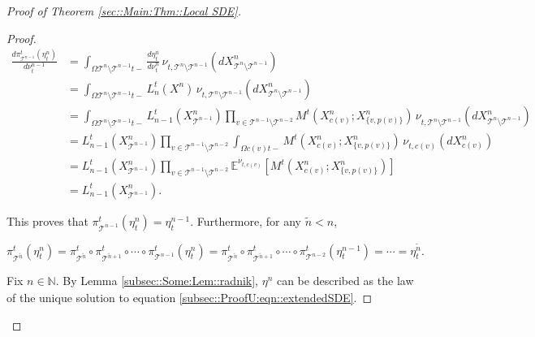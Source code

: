 \documentclass[12pt]{article}
\newcommand{\mb}{\mathbb}
\newcommand{\mc}{\mathcal}
\newcommand{\ind}{\hspace{24pt}}
\newcommand{\exmu}[2]{\mb{E}^{#1}\left[#2\right]}	%
\renewcommand{\v}{v}							%
\renewcommand{\t}{t}							%
\newcommand{\pup}[1]{^{#1}}							%
\newcommand{\tree}{\mc{T}}							%
\newcommand{\numb}{n}								%
\newcommand{\piV}[2]{\pi_{#1}^{#2}}					%
\newcommand{\rxvtsn}[3]{X_{#1}^{#3}{#2}}			%
\newcommand{\mm}[3]{\nu_{#2#1}^{#3}}						%
\newcommand{\mmm}[3]{\eta_{#2#1}^{#3}}						%
\newcommand{\alt}{\widetilde}						%
\newcommand{\dense}[2]{L_{#1}^{#2}}				%
\newcommand{\cdense}[2]{M_{#1}^{#2}}			%
\renewcommand{\c}[1]{c(#1)}						%
\newcommand{\p}[1]{p(#1)}						%
\begin{document}
\begin{proof}[Proof of Theorem \ref{sec::Main:Thm::Local SDE}]
\begin{proof}
\begin{align*}
\frac{d\piV{\tree\pup{\numb-1}}{\t}(\mmm{}{\t}{\numb})}{d\mm{}{\t}{\numb-1}} &= \int_{\Omega{\tree\pup{\numb}\setminus\tree\pup{\numb-1}}{\t-}} \frac{d\mmm{}{\t}{\numb}}{d\mm{}{\t}{\numb}}\,\mm{\tree\pup{\numb}\setminus\tree\pup{\numb-1}}{\t,}{}(d\rxvtsn{\tree\pup{\numb}\setminus\tree\pup{\numb-1}}{}{\numb})\\
&=\int_{\Omega{\tree\pup{\numb}\setminus\tree\pup{\numb-1}}{\t-}} \dense{\numb}{\t}(\rxvtsn{}{}{\numb})\,\mm{\tree\pup{\numb}\setminus\tree\pup{\numb-1}}{\t,}{}(d\rxvtsn{\tree\pup{\numb}\setminus\tree\pup{\numb-1}}{}{\numb})\\
&= \int_{\Omega{\tree\pup{\numb}\setminus\tree\pup{\numb-1}}{\t-}} \dense{\numb-1}{\t}(\rxvtsn{\tree\pup{\numb-1}}{}{\numb})\prod_{\v\in \tree\pup{\numb-1}\setminus\tree\pup{\numb-2}} \cdense{}{\t}(\rxvtsn{\c{\v}}{}{\numb};\rxvtsn{\{v,\p{\v}\}}{}{\numb})\,\mm{\tree\pup{\numb}\setminus\tree\pup{\numb-1}}{\t,}{}(d\rxvtsn{\tree\pup{\numb}\setminus\tree\pup{\numb-1}}{}{\numb})\\
&= \dense{\numb-1}{\t}(\rxvtsn{\tree\pup{\numb-1}}{}{\numb})\prod_{\v\in \tree\pup{\numb-1}\setminus\tree\pup{\numb-2}}\int_{\Omega{\c{\v}}{\t-}} \cdense{}{\t}(\rxvtsn{\c{\v}}{}{\numb};\rxvtsn{\{v,\p{\v}\}}{}{\numb})\,\mm{\c{\v}}{\t,}{}(d\rxvtsn{\c{\v}}{}{\numb})\\
&= \dense{\numb-1}{\t}(\rxvtsn{\tree\pup{\numb-1}}{}{\numb})\prod_{\v\in \tree\pup{\numb-1}\setminus\tree\pup{\numb-2}}\exmu{\mm{\c{\v}}{\t,}{}}{\cdense{}{\t}(\rxvtsn{\c{\v}}{}{\numb};\rxvtsn{\{v,\p{\v}\}}{}{\numb})}\\
&= \dense{\numb-1}{\t}(\rxvtsn{\tree\pup{\numb-1}}{}{\numb}).
\end{align*}

This proves that \(\piV{\tree\pup{\numb-1}}{\t}(\mmm{}{\t}{\numb}) = \mmm{}{\t}{\numb-1}\). Furthermore, for any \(\alt{\numb} < \numb\),

\[\piV{\tree\pup{\alt{\numb}}}{\t}(\mmm{}{\t}{\numb}) = \piV{\tree\pup{\alt\numb}}{\t}\circ\piV{\tree\pup{\alt{\numb} + 1}}{\t} \circ\cdots\circ \piV{\tree\pup{\numb-1}}{\t}(\mmm{}{\t}{\numb}) = \piV{\tree\pup{\alt\numb}}{\t}\circ\piV{\tree\pup{\alt{\numb} + 1}}{\t} \circ\cdots\circ \piV{\tree\pup{\numb-2}}{\t}(\mmm{}{\t}{\numb-1}) = \cdots = \mmm{}{\t}{\alt{\numb}}.\]

\ind Fix \(\numb\in\mb{N}\). By Lemma \ref{subsec::Some:Lem::radnik}, \(\mmm{}{}{\numb}\) can be described as the law of the unique solution to equation \eqref{subsec::ProofU:eqn::extendedSDE}.
\end{proof}


\end{proof}
\end{document}
